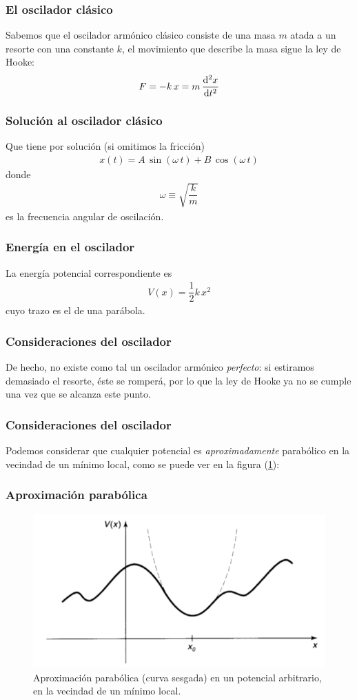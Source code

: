 \documentclass[12pt]{beamer}
\begin{document}
\begin{frame}
\frametitle{El oscilador clásico}
Sabemos que el oscilador armónico clásico consiste de una masa $m$ atada a un resorte con una constante $k$, el movimiento que describe la masa sigue la ley de Hooke:
\pause
\begin{align*}
    F = - k \, x = m \, \dv[2]{x}{t}
\end{align*}
\end{frame}
\begin{frame}
\frametitle{Solución al oscilador clásico}
Que tiene por solución (si omitimos la fricción)
\begin{align*}
    x(t) = A \, \sin (\omega \, t) + B \, \cos (\omega \, t)
\end{align*}
\pause
donde
\begin{align}
    \omega \equiv \sqrt{\dfrac{k}{m}}
    \label{eq:ecuacion_02_036}
\end{align}
es la frecuencia angular de oscilación.
\end{frame}
\begin{frame}
\frametitle{Energía en el oscilador}
La energía potencial correspondiente es
\begin{align}
    V(x) = \dfrac{1}{2} k \, x^{2}
    \label{eq:ecuacion_02_037}
\end{align}
cuyo trazo es el de una parábola.
\end{frame}
\begin{frame}
\frametitle{Consideraciones del oscilador}
De hecho, no existe como tal un oscilador armónico \emph{perfecto}: si estiramos demasiado el resorte, éste se romperá, por lo que la ley de Hooke ya no se cumple una vez que se alcanza este punto.
\end{frame}
\begin{frame}
\frametitle{Consideraciones del oscilador}
Podemos considerar que cualquier potencial es \textit{aproximadamente} parabólico en la vecindad de un mínimo local, como se puede ver en la figura (\ref{fig:figura_001}):
\end{frame}
\begin{frame}
\frametitle{Aproximación parabólica}
\begin{figure}[H]
    \centering
    \includegraphics[scale=0.4]{Imagenes/Potencial_arbitrario.png}
    \caption{Aproximación parabólica (curva sesgada) en un potencial arbitrario, en la vecindad de un mínimo local.}
    \label{fig:figura_001}
\end{figure}
\end{frame}
\end{document}

